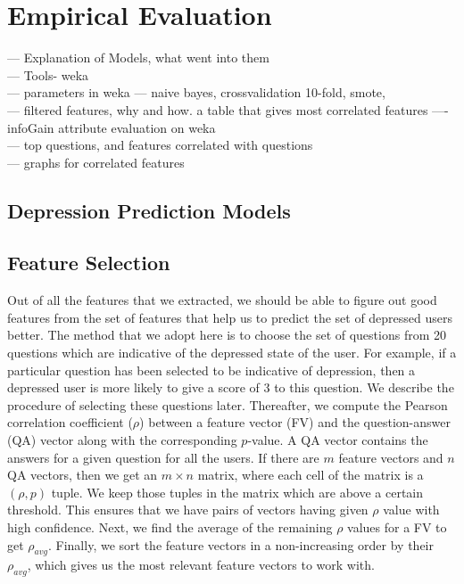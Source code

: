 
\section{Empirical Evaluation}
\label{sec:experiments}

--- Explanation of Models, what went into them\\
--- Tools- weka \\
--- parameters in weka --- naive bayes, crossvalidation 10-fold, smote, \\
--- filtered features, why and how. a table that gives most correlated features ---- infoGain attribute evaluation on weka\\
--- top questions, and features correlated with questions\\
--- graphs for correlated features
\subsection{Depression Prediction Models}


\subsection{Feature Selection}

Out of all the features that we extracted, we should be able to figure out good features from the set of features that help us to predict the set of depressed users better. The method that we adopt here is to choose the set of questions from 20 questions which are indicative of the depressed state of the user. For example, if a particular question has been selected to be indicative of depression, then a depressed user is more likely to give a score of 3 to this question. We describe the procedure of selecting these questions later. Thereafter, we compute the Pearson correlation coefficient ($\rho$) between a feature vector (FV) and the question-answer (QA) vector along with the corresponding $p$-value. A QA vector contains the answers for a given question for all the users. If there are $m$ feature vectors and $n$ QA vectors, then we get an $m\times n$ matrix, where each cell of the matrix is a $(\rho, p)$ tuple. We keep those tuples in the matrix which are above a certain threshold. This ensures that we have pairs of vectors having given $\rho$ value with high confidence. Next, we find the average of the remaining $\rho$ values for a FV to get $\rho_{avg}$. Finally, we sort the feature vectors in a non-increasing order by their $\rho_{avg}$, which gives us the most relevant feature vectors to work with.

